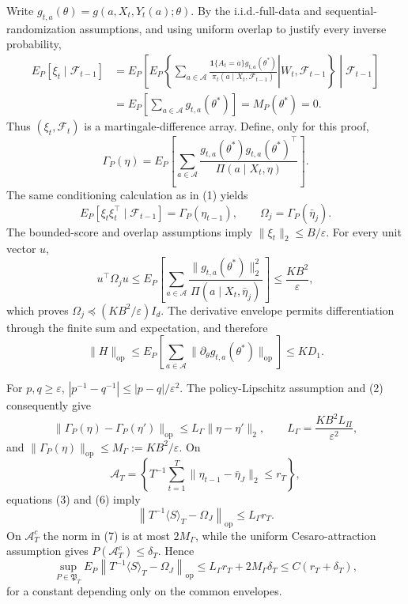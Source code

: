Write \(g_{t,a}(\theta)=g(a,X_t,Y_t(a);\theta)\). By the i.i.d.-full-data and sequential-randomization assumptions, and using uniform overlap to justify every inverse probability,
\[
\begin{aligned}
E_P[\xi_t\mid\mathcal F_{t-1}]
&=E_P\!\left[E_P\!\left\{\left.\sum_{a\in\mathcal A}
 \frac{\mathbf 1\{A_t=a\}g_{t,a}(\theta^*)}
 {\pi_t(a\mid X_t,\mathcal F_{t-1})}\right|W_t,\mathcal F_{t-1}\right\}\middle|\mathcal F_{t-1}\right]\\
&=E_P\!\left[\sum_{a\in\mathcal A}g_{t,a}(\theta^*)\right]
=M_P(\theta^*)=0.
\end{aligned} \tag{1}
\]
Thus \((\xi_t,\mathcal F_t)\) is a martingale-difference array. Define, only for this proof,
\[
 \Gamma_P(\eta)=E_P\!\left[\sum_{a\in\mathcal A}
 \frac{g_{t,a}(\theta^*)g_{t,a}(\theta^*)^\top}
 {\Pi(a\mid X_t,\eta)}\right]. \tag{2}
\]
The same conditioning calculation as in (1) yields
\[
 E_P[\xi_t\xi_t^\top\mid\mathcal F_{t-1}]=\Gamma_P(\eta_{t-1}),
 \qquad \Omega_j=\Gamma_P(\bar\eta_j). \tag{3}
\]
The bounded-score and overlap assumptions imply \(\|\xi_t\|_2\le B/\varepsilon\). For every unit vector \(u\),
\[
 u^\top\Omega_ju
 \le E_P\!\left[\sum_{a\in\mathcal A}
 \frac{\|g_{t,a}(\theta^*)\|_2^2}{\Pi(a\mid X_t,\bar\eta_j)}\right]
 \le \frac{KB^2}{\varepsilon}, \tag{4}
\]
which proves \(\Omega_j\preceq(KB^2/\varepsilon)I_d\). The derivative envelope permits differentiation through the finite sum and expectation, and therefore
\[
 \|H\|_{\mathrm{op}}
 \le E_P\!\left[\sum_{a\in\mathcal A}
 \|\partial_\theta g_{t,a}(\theta^*)\|_{\mathrm{op}}\right]
 \le KD_1. \tag{5}
\]

For \(p,q\ge\varepsilon\), \(|p^{-1}-q^{-1}|\le |p-q|/\varepsilon^2\). The policy-Lipschitz assumption and (2) consequently give
\[
 \|\Gamma_P(\eta)-\Gamma_P(\eta')\|_{\mathrm{op}}
 \le L_\Gamma\|\eta-\eta'\|_2,
 \qquad L_\Gamma=\frac{KB^2L_\Pi}{\varepsilon^2}, \tag{6}
\]
and \(\|\Gamma_P(\eta)\|_{\mathrm{op}}\le M_\Gamma:=KB^2/\varepsilon\). On
\[
 \mathcal A_T=\left\{T^{-1}\sum_{t=1}^T
 \|\eta_{t-1}-\bar\eta_J\|_2\le r_T\right\},
\]
equations (3) and (6) imply
\[
 \left\|T^{-1}\langle S\rangle_T-\Omega_J\right\|_{\mathrm{op}}
 \le L_\Gamma r_T. \tag{7}
\]
On \(\mathcal A_T^c\) the norm in (7) is at most \(2M_\Gamma\), while the uniform Cesaro-attraction assumption gives \(P(\mathcal A_T^c)\le\delta_T\). Hence
\[
 \sup_{P\in\mathfrak P_T}E_P\left\|T^{-1}\langle S\rangle_T-\Omega_J\right\|_{\mathrm{op}}
 \le L_\Gamma r_T+2M_\Gamma\delta_T
 \le C(r_T+\delta_T), \tag{8}
\]
for a constant depending only on the common envelopes.

